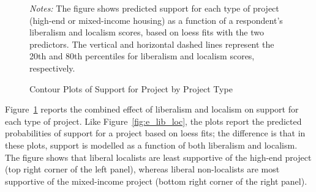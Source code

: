 \documentclass[article,11pt]{memoir}
\begin{document}
\begin{figure}[t]
  \caption{Contour Plots of Support for Project by Project Type}
  \label{fig:e_contour}
  \begin{measuredfigure}
  \end{measuredfigure}
  \begin{tablenotes}[flushleft]
    \item \hspace{-.2em}\emph{Notes:} The figure shows predicted support for each type of project (high-end or mixed-income housing) as a function of a respondent's liberalism and localism scores, based on loess fits with the two predictors.  The vertical and horizontal dashed lines represent the 20th and 80th percentiles for liberalism and localism scores, respectively.
  \end{tablenotes}
\end{figure}

Figure~\ref{fig:e_contour} reports the combined effect of liberalism and localism on support for each type of project.  Like Figure~\ref{fig:e_lib_loc}, the plots report the predicted probabilities of support for a project based on loess fits; the difference is that in these plots, support is modelled as a function of both liberalism and localism.  The figure shows that liberal localists are least supportive of the high-end project (top right corner of the left panel), whereas liberal non-localists are most supportive of the mixed-income project (bottom right corner of the right panel). 
\end{document}
